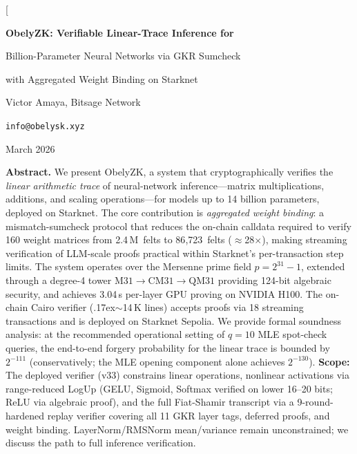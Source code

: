 \documentclass[10pt,twocolumn]{article}
\theoremstyle{definition}
\theoremstyle{remark}
\newcommand{\M}{\mathrm{M31}}
\newcommand{\CM}{\mathrm{CM31}}
\newcommand{\QM}{\mathrm{QM31}}
\begin{document}
\makeatletter
\twocolumn[
\begin{@twocolumnfalse}
\begin{center}
  {\LARGE\bfseries ObelyZK: Verifiable Linear-Trace Inference for\par
   \vspace{4pt}
   Billion-Parameter Neural Networks via GKR Sumcheck\par
   \vspace{4pt}
   with Aggregated Weight Binding on Starknet}

  \vspace{12pt}

  {\large Victor Amaya, Bitsage Network}\par
  \vspace{4pt}
  {\small\texttt{info@obelysk.xyz}}

  \vspace{8pt}

  {\small March 2026}

  \vspace{10pt}

  \begin{minipage}{0.92\textwidth}
    \small\textbf{Abstract.}
    We present ObelyZK, a system that cryptographically verifies the
    \emph{linear arithmetic trace} of neural-network inference---matrix
    multiplications, additions, and scaling operations---for models up
    to 14 billion parameters, deployed on Starknet.
    The core contribution is \emph{aggregated weight binding}: a
    mismatch-sumcheck protocol that reduces the on-chain calldata
    required to verify 160 weight matrices from 2.4\,M~felts to
    86{,}723~felts ($\approx$28$\times$), making streaming
    verification of LLM-scale proofs practical within Starknet's
    per-transaction step limits.
    The system operates over the Mersenne prime field
    $p = 2^{31}-1$, extended through a degree-4 tower
    $\M \to \CM \to \QM$ providing 124-bit algebraic security,
    and achieves 3.04\,s per-layer GPU proving on NVIDIA H100.
    The on-chain Cairo verifier ({\raise.17ex\hbox{$\scriptstyle\sim$}}14\,K
    lines) accepts proofs via 18 streaming transactions and is
    deployed on Starknet Sepolia.
    We provide formal soundness analysis: at the recommended
    operational setting of $q=10$ MLE spot-check queries,
    the end-to-end forgery probability for the linear trace
    is bounded by $2^{-111}$ (conservatively; the MLE opening
    component alone achieves $2^{-130}$).
    \textbf{Scope:} The deployed verifier (v33) constrains
    linear operations, nonlinear activations
    via range-reduced LogUp (GELU, Sigmoid, Softmax verified
    on lower 16--20 bits; ReLU via algebraic proof), and
    the full Fiat-Shamir transcript via a 9-round-hardened
    replay verifier covering all 11 GKR layer tags,
    deferred proofs, and weight binding.
    LayerNorm/RMSNorm mean/variance remain unconstrained;
    we discuss the path to full inference verification.
  \end{minipage}


\end{center}
\end{@twocolumnfalse}
\end{document}
